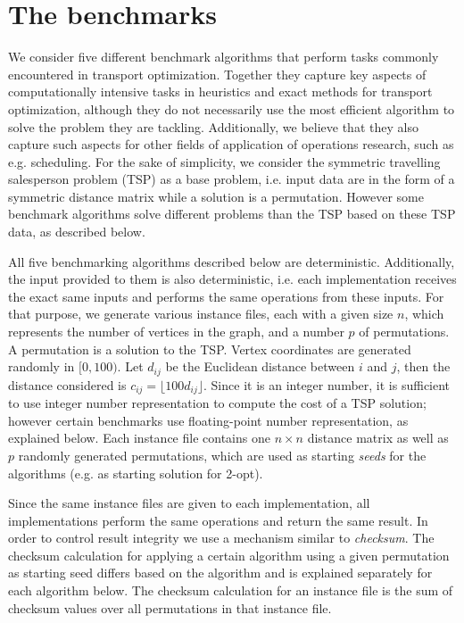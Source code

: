 \documentclass[11pt,a4paper,notitlepage]{article}
\begin{document}
\section{The benchmarks}
We consider five different benchmark algorithms that perform tasks
commonly encountered in transport optimization. Together they capture
key aspects of computationally intensive tasks in heuristics and
exact methods for transport optimization, although they do not
necessarily use the most efficient algorithm to solve the problem they
are tackling. Additionally, we believe
that they also capture such aspects for other fields of application
of operations research, such as e.g. scheduling. For the sake of
simplicity, we consider the symmetric travelling salesperson problem
(TSP) as a base problem, i.e. input data are in the form of a
symmetric distance matrix while a solution is a permutation. However
some benchmark algorithms solve different problems than the TSP based on these
TSP data, as described below.

All five benchmarking algorithms described below are deterministic.
Additionally, the input provided to them is also deterministic,
i.e. each implementation receives the exact same inputs and performs
the same operations from these inputs. For that purpose, we generate
various instance files, each with a given size $n$, which represents
the number of vertices in the graph, and a number $p$ of
permutations. A permutation is a solution to the TSP.
Vertex coordinates are generated randomly in $[0, 100)$. Let $d_{ij}$
be the Euclidean distance between $i$ and $j$, then the distance
considered is $c_{ij} = \lfloor 100 d_{ij} \rfloor$. Since it is an
integer number, it is sufficient to use integer number representation
to compute the cost of a TSP solution; however certain benchmarks use
floating-point number representation, as explained below.
Each instance
file contains one $n \times n$ distance matrix as well as $p$ randomly
generated permutations, which are used as starting \emph{seeds} for
the algorithms (e.g. as starting solution for 2-opt).

Since the same instance files are given to 
each implementation, all implementations perform the same operations
and return the same result. In order to control result integrity we use a
mechanism similar to \emph{checksum}. The checksum calculation for
applying a certain algorithm using a given permutation as starting seed differs
based on the algorithm and is explained separately for each algorithm
below. The checksum calculation for an instance file is the sum of
checksum values over all permutations in that instance file.
\end{document}
